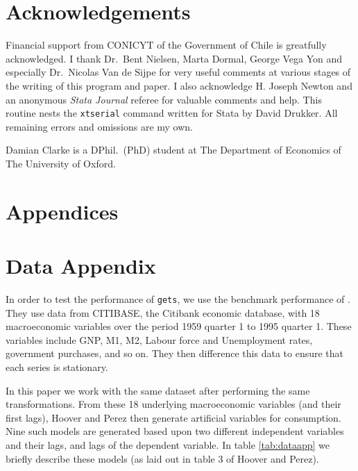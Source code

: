 \documentclass[bib]{statapress}
\begin{document}
\section{Acknowledgements}
Financial support from CONICYT of the Government of Chile is greatfully 
acknowledged.  I thank Dr.\ Bent Nielsen, Marta Dormal, George Vega Yon and
especially Dr.\ Nicolas Van de Sijpe for very useful comments at various stages
of the writing of this program and paper.  I also acknowledge H. Joseph Newton 
and an anonymous \emph{Stata Journal} referee for valuable comments and help.  
This routine nests the \texttt{xtserial} command written for Stata by David 
Drukker.  All remaining errors and omissions are my own.


\newpage


\begin{aboutauthor}
Damian Clarke is a DPhil.\ (PhD) student at The Department of Economics of The 
University of Oxford.

\end{aboutauthor}

\newpage
\section*{Appendices}
\appendix
\section{Data Appendix}
\label{scn:dataapp}
In order to test the performance of \texttt{gets}, we use the benchmark 
performance of \citet{HooverPerez1999}.  They use data from CITIBASE, the 
Citibank economic database, with 18 macroeconomic variables over the period
1959 quarter 1 to 1995 quarter 1.  These variables include GNP, M1, M2, Labour
force and Unemployment rates, government purchases, and so on.  They then 
difference this data to ensure that each series is stationary.

In this paper we work with the same dataset after performing the same 
transformations.  From these 18 underlying macroeconomic variables (and their
first lags), Hoover and Perez then generate artificial variables for 
consumption.  Nine such models are generated based upon two different 
independent variables and their lags, and lags of the dependent variable.  In 
table \ref{tab:dataapp} we briefly describe these models (as laid out in table 
3 of Hoover and Perez).
\end{document}
